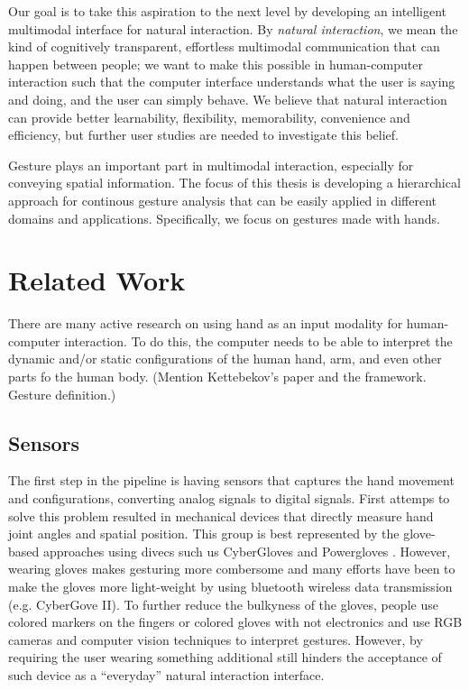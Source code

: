 Our goal is to take this aspiration to the next level by developing an
intelligent multimodal interface for natural interaction. By \textit{natural
interaction}, we mean the kind of cognitively transparent, effortless multimodal
communication that can happen between people; we want to make this possible in
human-computer interaction such that the computer interface understands what the
user is saying and doing, and the user can simply behave. We believe that
natural interaction can provide better learnability, flexibility, memorability,
convenience and efficiency, but further user studies are needed to investigate
this belief.

Gesture plays an important part in multimodal interaction, especially for
conveying spatial information. The focus of this thesis is developing a
hierarchical approach for continous gesture analysis that can be easily
applied in different domains and applications. Specifically, we focus on
gestures made with hands.

\section{Related Work}
There are many active research on using hand as an input modality for
human-computer interaction. To do this, the computer needs to be able to
interpret the dynamic and/or static configurations of the human hand, arm, and
even other parts fo the human body. (Mention Kettebekov's paper and the
framework. Gesture definition.)

\subsection{Sensors}
The first step in the pipeline is having sensors that captures the hand movement
and configurations, converting analog signals to digital signals. First attemps
to solve this problem resulted in mechanical devices that directly measure hand
joint angles and spatial position. This group is best represented by the
glove-based approaches using divecs such us CyberGloves \cite{fels09} and
Powergloves \cite{kadous02}. However, wearing gloves makes gesturing more
combersome and many efforts have been to make the gloves more light-weight by
using bluetooth wireless data transmission (e.g. CyberGove II). To further
reduce the bulkyness of the gloves, people use colored markers on the fingers
\cite{mistry09} or colored gloves with not electronics \cite{Wang09} and use RGB
cameras and computer vision techniques to interpret gestures. However, by
requiring the user wearing something additional still hinders the acceptance of
such device as a ``everyday'' natural interaction interface. 


